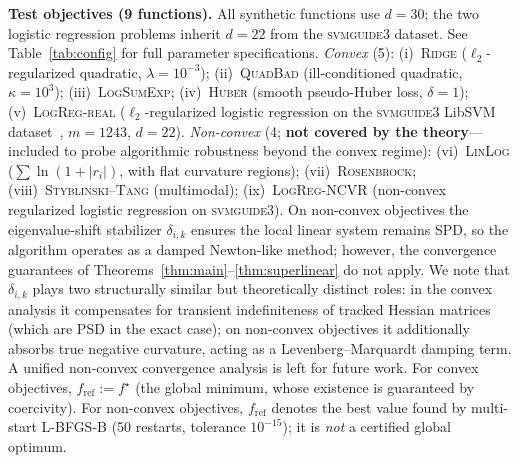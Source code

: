 \documentclass[11pt,a4paper]{article}
\begin{document}
	\noindent\textbf{Test objectives (9 functions).}
	All synthetic functions use $d{=}30$; the two logistic regression problems
	inherit $d{=}22$ from the \textsc{svmguide3} dataset.
	See Table~\ref{tab:config} for full parameter specifications.
	\textit{Convex} (5):
	(i)~\textsc{Ridge} ($\ell_2$-regularized quadratic, $\lambda{=}10^{-3}$);
	(ii)~\textsc{QuadBad} (ill-conditioned quadratic, $\kappa{=}10^3$);
	(iii)~\textsc{LogSumExp};
	(iv)~\textsc{Huber} (smooth pseudo-Huber loss, $\delta{=}1$);
	(v)~\textsc{LogReg-real} ($\ell_2$-regularized logistic regression on the
	\textsc{svmguide3} LibSVM dataset~\citep{chang2011libsvm}, $m{=}1243$, $d{=}22$).
	\textit{Non-convex} (4; \textbf{not covered by the theory}---included
	to probe algorithmic robustness beyond the convex regime):
	(vi)~\textsc{LinLog} ($\sum\ln(1{+}|r_i|)$, with flat curvature regions);
	(vii)~\textsc{Rosenbrock};
	(viii)~\textsc{Styblinski--Tang} (multimodal);
	(ix)~\textsc{LogReg-NCVR} (non-convex regularized logistic regression on
	\textsc{svmguide3}).
	On non-convex objectives the eigenvalue-shift stabilizer $\delta_{i,k}$
	ensures the local linear system remains SPD, so the algorithm operates
	as a damped Newton-like method; however, the convergence
	guarantees of Theorems~\ref{thm:main}--\ref{thm:superlinear} do
	not apply.
	We note that $\delta_{i,k}$ plays two structurally similar but
	theoretically distinct roles:
	in the convex analysis it compensates for transient indefiniteness of
	tracked Hessian matrices (which are PSD in the exact case);
	on non-convex objectives it additionally absorbs true negative
	curvature, acting as a Levenberg--Marquardt damping term.
	A unified non-convex convergence analysis is left for future work.
	For convex objectives, $f_{\mathrm{ref}}:=f^\star$ (the global minimum,
	whose existence is guaranteed by coercivity).
	For non-convex objectives, $f_{\mathrm{ref}}$ denotes the best value
	found by multi-start L-BFGS-B (50 restarts, tolerance $10^{-15}$);
	it is \emph{not} a certified global optimum.
	
\end{document}
